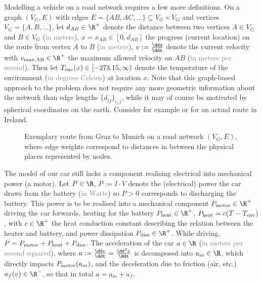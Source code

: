 \documentclass{prettytex/ox/mmsc-special-topic}
\begin{document}
  Modelling a vehicle on a road network requires a few more definitions.
  On a graph $(V_G, E)$ with edges $E = \{AB, AC, ...\} \subseteq V_G \times V_G$ and vertices $V_G = \{A, B, ...\}$, let
  $d_{AB} \in \R^+$ denote the distance between two vertices $A \in V_G$ and $B \in V_G$ (\textcolor{gray}{in meters}),
  $x = x_{AB} \in [0, d_{AB}]$ the progress (current location) on the route from vertex $A$ to $B$ (\textcolor{gray}{in meters}),
  $v := \frac{\ddx}{\ddt}$ denote the current velocity with
  $v_{\rm max, AB} \in \R^+$ the maximum allowed velocity on $AB$ (\textcolor{gray}{in meters per second}).
  Then let
  $T_{\rm env}(x) \in [-273.15, \infty)$ denote the temperature of the environment (\textcolor{gray}{in degrees Celsius}) at location $x$.
  Note that this graph-based approach to the problem does not require any more geometric information about the network than edge lengths $\{d_{ij}\}_{i,j}$, while it may of course be motivated by spherical coordinates on the earth.
  Consider for example  or  for an actual route in Ireland.

  \begin{figure}[H]
    \centering
    \caption{Exemplary route from Graz to Munich on a road network $(V_G, E)$, where edge weights correspond to distances in between the physical places represented by nodes.}
    \label{fig:graz-to-munich}
  \end{figure}

  The model of our car still lacks a component realising electrical into mechanical power (a motor).
  Let $P \in \R$, $P := I \cdot V$ denote the (electrical) power the car draws from the battery (\textcolor{gray}{in Watts}) so $P > 0$ corresponds to discharging the battery.
  This power is to be realised into a mechanical component $P_{\rm motor} \in \R^+$ driving the car forwards, heating for the battery $P_{\rm heat} \in \R^+$, $P_{\rm heat} = c (T - T_{\rm env})$, with $c \in \R^+$ the heat conduction constant describing the relation between the heater and battery, and power dissipation $P_{\rm diss} \in \R^+$.
  While driving, $P = P_{\rm motor} + P_{\rm heat} + P_{\rm diss}$.
  The acceleration of the car $a \in \R$ (\textcolor{gray}{in meters per second squared}), where $a := \frac{\dd v}{\ddt} = \frac{\dd^2 x}{\ddt}$ is decomposed into $a_m \in \R$, which directly impacts $P_{\rm motor}(a_m)$, and the deceleration due to friction (air, etc.) $a_f(v) \in \R^-$, so that in total $a = a_m + a_f$.
\end{document}

